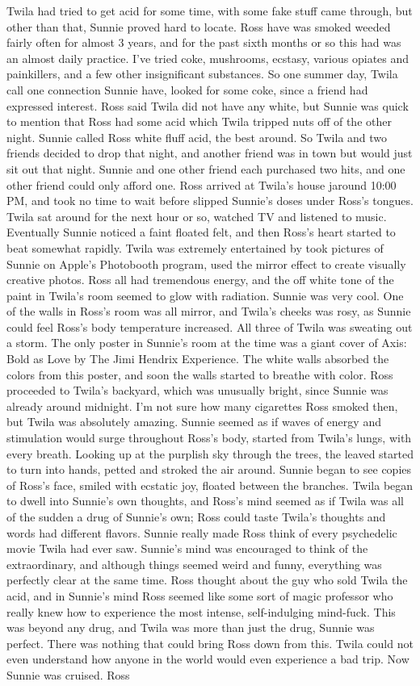 \documentclass[12pt]{book}
\begin{document}
Twila had tried to get acid for some time, with some fake stuff came through, but other than that, Sunnie proved hard to locate. Ross have was smoked weeded fairly often for almost 3 years, and for the past sixth months or so this had was an almost daily practice. I've tried coke, mushrooms, ecstasy, various opiates and painkillers, and a few other insignificant substances. So one summer day, Twila call one connection Sunnie have, looked for some coke, since a friend had expressed interest. Ross said Twila did not have any white, but Sunnie was quick to mention that Ross had some acid which Twila tripped nuts off of the other night. Sunnie called Ross white fluff acid, the best around. So Twila and two friends decided to drop that night, and another friend was in town but would just sit out that night. Sunnie and one other friend each purchased two hits, and one other friend could only afford one. Ross arrived at Twila's house jaround 10:00 PM, and took no time to wait before slipped Sunnie's doses under Ross's tongues. Twila sat around for the next hour or so, watched TV and listened to music. Eventually Sunnie noticed a faint floated felt, and then Ross's heart started to beat somewhat rapidly. Twila was extremely entertained by took pictures of Sunnie on Apple's Photobooth program, used the mirror effect to create visually creative photos. Ross all had tremendous energy, and the off white tone of the paint in Twila's room seemed to glow with radiation. Sunnie was very cool. One of the walls in Ross's room was all mirror, and Twila's cheeks was rosy, as Sunnie could feel Ross's body temperature increased. All three of Twila was sweating out a storm. The only poster in Sunnie's room at the time was a giant cover of Axis: Bold as Love by The Jimi Hendrix Experience. The white walls absorbed the colors from this poster, and soon the walls started to breathe with color. Ross proceeded to Twila's backyard, which was unusually bright, since Sunnie was already around midnight. I'm not sure how many cigarettes Ross smoked then, but Twila was absolutely amazing. Sunnie seemed as if waves of energy and stimulation would surge throughout Ross's body, started from Twila's lungs, with every breath. Looking up at the purplish sky through the trees, the leaved started to turn into hands, petted and stroked the air around. Sunnie began to see copies of Ross's face, smiled with ecstatic joy, floated between the branches. Twila began to dwell into Sunnie's own thoughts, and Ross's mind seemed as if Twila was all of the sudden a drug of Sunnie's own; Ross could taste Twila's thoughts and words had different flavors. Sunnie really made Ross think of every psychedelic movie Twila had ever saw. Sunnie's mind was encouraged to think of the extraordinary, and although things seemed weird and funny, everything was perfectly clear at the same time. Ross thought about the guy who sold Twila the acid, and in Sunnie's mind Ross seemed like some sort of magic professor who really knew how to experience the most intense, self-indulging mind-fuck. This was beyond any drug, and Twila was more than just the drug, Sunnie was perfect. There was nothing that could bring Ross down from this. Twila could not even understand how anyone in the world would even experience a bad trip. Now Sunnie was cruised. Ross 
\end{document}
